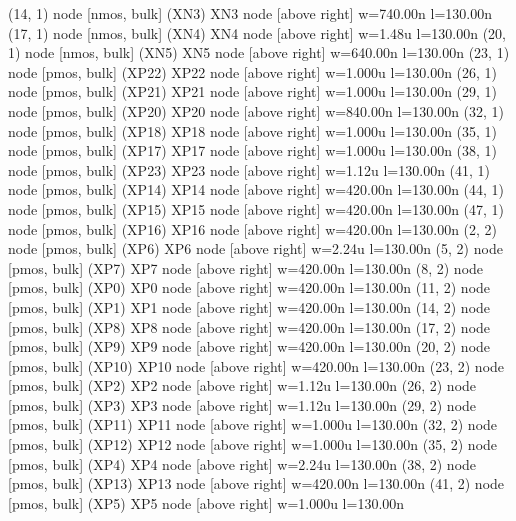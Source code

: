 \begin{circuitikz}[american]
	(14, 1) node [nmos, bulk] (XN3) {XN3} node [above right] {\tiny {w=740.00n l=130.00n}}
	(17, 1) node [nmos, bulk] (XN4) {XN4} node [above right] {\tiny {w=1.48u l=130.00n}}
	(20, 1) node [nmos, bulk] (XN5) {XN5} node [above right] {\tiny {w=640.00n l=130.00n}}
	(23, 1) node [pmos, bulk] (XP22) {XP22} node [above right] {\tiny {w=1.000u l=130.00n}}
	(26, 1) node [pmos, bulk] (XP21) {XP21} node [above right] {\tiny {w=1.000u l=130.00n}}
	(29, 1) node [pmos, bulk] (XP20) {XP20} node [above right] {\tiny {w=840.00n l=130.00n}}
	(32, 1) node [pmos, bulk] (XP18) {XP18} node [above right] {\tiny {w=1.000u l=130.00n}}
	(35, 1) node [pmos, bulk] (XP17) {XP17} node [above right] {\tiny {w=1.000u l=130.00n}}
	(38, 1) node [pmos, bulk] (XP23) {XP23} node [above right] {\tiny {w=1.12u l=130.00n}}
	(41, 1) node [pmos, bulk] (XP14) {XP14} node [above right] {\tiny {w=420.00n l=130.00n}}
	(44, 1) node [pmos, bulk] (XP15) {XP15} node [above right] {\tiny {w=420.00n l=130.00n}}
	(47, 1) node [pmos, bulk] (XP16) {XP16} node [above right] {\tiny {w=420.00n l=130.00n}}
	(2, 2) node [pmos, bulk] (XP6) {XP6} node [above right] {\tiny {w=2.24u l=130.00n}}
	(5, 2) node [pmos, bulk] (XP7) {XP7} node [above right] {\tiny {w=420.00n l=130.00n}}
	(8, 2) node [pmos, bulk] (XP0) {XP0} node [above right] {\tiny {w=420.00n l=130.00n}}
	(11, 2) node [pmos, bulk] (XP1) {XP1} node [above right] {\tiny {w=420.00n l=130.00n}}
	(14, 2) node [pmos, bulk] (XP8) {XP8} node [above right] {\tiny {w=420.00n l=130.00n}}
	(17, 2) node [pmos, bulk] (XP9) {XP9} node [above right] {\tiny {w=420.00n l=130.00n}}
	(20, 2) node [pmos, bulk] (XP10) {XP10} node [above right] {\tiny {w=420.00n l=130.00n}}
	(23, 2) node [pmos, bulk] (XP2) {XP2} node [above right] {\tiny {w=1.12u l=130.00n}}
	(26, 2) node [pmos, bulk] (XP3) {XP3} node [above right] {\tiny {w=1.12u l=130.00n}}
	(29, 2) node [pmos, bulk] (XP11) {XP11} node [above right] {\tiny {w=1.000u l=130.00n}}
	(32, 2) node [pmos, bulk] (XP12) {XP12} node [above right] {\tiny {w=1.000u l=130.00n}}
	(35, 2) node [pmos, bulk] (XP4) {XP4} node [above right] {\tiny {w=2.24u l=130.00n}}
	(38, 2) node [pmos, bulk] (XP13) {XP13} node [above right] {\tiny {w=420.00n l=130.00n}}
	(41, 2) node [pmos, bulk] (XP5) {XP5} node [above right] {\tiny {w=1.000u l=130.00n}}



\end{circuitikz}
